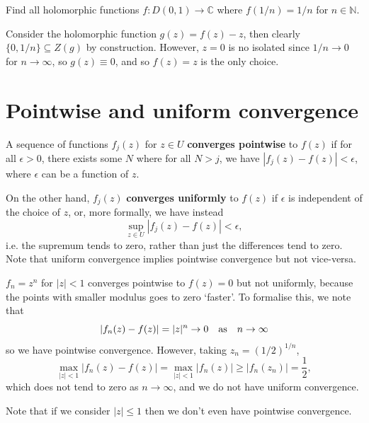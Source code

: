 \documentclass[letter-paper]{tufte-book}
\newenvironment{example}[1][Example]{\begin{trivlist}
\item[\hskip \labelsep {\bfseries #1}]}{\end{trivlist}}
\begin{document}
\begin{example}
  Find all holomorphic functions $f:D(0, 1) \to \mathbb{C}$ where $f(1/n) = 1/n$
  for $n\in\mathbb{N}$.
  
  Consider the holomorphic function $g(z) = f(z) - z$, then clearly $\{0, 1/n\}
  \subseteq Z(g)$ by construction. However, $z=0$ is no isolated since $1/n\to
  0$ for $n\to \infty$, so $g(z) \equiv 0$, and so $f(z) = z$ is the only
  choice.
\end{example}


\section{Pointwise and uniform convergence}

A sequence of functions $f_j(z)$ for $z\in U$ \textbf{converges pointwise} to
$f(z)$ if for all $\epsilon > 0$, there exists some $N$ where for all $N > j$,
we have $|f_j(z) - f(z)| < \epsilon$, where $\epsilon$ can be a function of $z$. 

On the other hand, $f_j(z)$ \textbf{converges uniformly} to $f(z)$ if $\epsilon$
is independent of the choice of $z$, or, more formally, we have instead
\begin{equation}
  \sup_{z\in U} |f_j(z) - f(z)| < \epsilon,
\end{equation}
i.e. the supremum tends to zero, rather than just the differences tend to zero.
Note that uniform convergence implies pointwise convergence but not vice-versa.

\begin{example}
  $f_n = z^n$ for $|z|<1$ converges pointwise to $f(z) = 0$ but not uniformly,
  because the points with smaller modulus goes to zero `faster'. To formalise
  this, we note that
  \begin{equation*}
    |f_n(z) - f(z)| = |z|^n \to 0 \quad \textnormal{as} \quad n \to \infty
  \end{equation*}
  so we have pointwise convergence. However, taking $z_n = (1/2)^{1/n}$,
  \begin{equation*}
    \max_{|z|<1} |f_n(z) - f(z)| = \max_{|z|<1} |f_n(z)| \geq |f_n(z_n)| = \frac{1}{2},
  \end{equation*}
  which does not tend to zero as $n\to\infty$, and we do not have uniform
  convergence.
  
  Note that if we consider $|z| \leq 1$ then we don't even have pointwise
  convergence.
\end{example}
\end{document}
